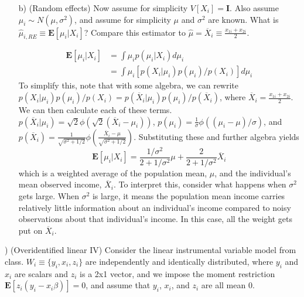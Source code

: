\documentclass[12pt,english]{article}
\begin{document}
\begin{enumerate}
	\vspace{1em}
	\noindent
	\item[b)] (Random effects) Now assume for simplicity $V[X_{i}] = \mathbf{I}$. Also assume $\mu_{i} \sim N(\mu, \sigma^{2})$, and assume for simplicity $\mu$ and $\sigma^{2}$ are known. What is $\hat{\mu}_{i,RE} \equiv \mathbf{E}[\mu_{i} | X_{i}]$? Compare this estimator to $\hat{\mu} = \overline{X}_{i} \equiv \frac{x_{1i} + x_{2i}}{2}$.
	\vspace{1em}
	
	\begin{align*}
	\mathbf{E}[\mu_{i} | X_{i}] & = \int \mu_{i} p(\mu_{i} | X_{i}) d\mu_{i} \\
	& = \int \mu_{i} \left[ p(X_{i} | \mu_{i}) p(\mu_{i}) / p(X_{i}) \right] d\mu_{i}
	\end{align*}
	To simplify this, note that with some algebra, we can rewrite $p(X_{i} | \mu_{i}) p(\mu_{i}) / p(X_{i}) = p(\overline{X}_{i} | \mu_{i}) p(\mu_{i}) / p(\overline{X}_{i})$, where $\overline{X}_{i} = \frac{x_{1i} + x_{2i}}{2}$. We can then calculate each of these terms. $p(\overline{X}_{i} | \mu_{i}) = \sqrt{2} \phi(\sqrt{2}(\overline{X}_{i} - \mu_{i}))$, $p(\mu_{i}) = \frac{1}{\sigma} \phi((\mu_{i} - \mu)/\sigma)$, and $p(\overline{X}_{i}) = \frac{1}{\sqrt{\sigma^{2} + 1/2}}\phi \left(\frac{\overline{X}_{i} - \mu}{\sqrt{\sigma^{2} + 1/2}} \right)$. Substituting these and further algebra yields
	$$\mathbf{E}[\mu_{i} | X_{i}] = \frac{1/\sigma^{2}}{2 + 1/\sigma^{2}} \mu + \frac{2}{2 + 1/\sigma^{2}} \overline{X}_{i} $$
	which is a weighted average of the population mean, $\mu$, and the individual's mean observed income, $\overline{X}_{i}$. To interpret this, consider what happens when $\sigma^{2}$ gets large. When $\sigma^{2}$ is large, it means the population mean income carries relatively little information about an individual's income compared to noisy observations about that individual's income. In this case, all the weight gets put on $\overline{X}_{i}$.
	\vspace{1em}
\end{enumerate}

\vspace{1em}
) (Overidentified linear IV) Consider the linear instrumental variable model from class. $W_{i} \equiv \{ y_{i}, x_{i}, z_{i} \}$ are independently and identically distributed, where $y_{i}$ and $x_{i}$ are scalars and $z_{i}$ is a 2x1 vector, and we impose the moment restriction $\mathbf{E}[z_{i}(y_{i} - x_{i} \beta)] = 0$, and assume that $y_{i}$, $x_{i}$, and $z_{i}$ are all mean 0.
\end{document}
